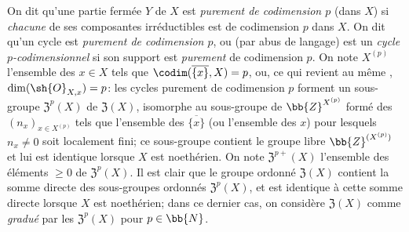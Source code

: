 \begin{env}[21.6.2]
On dit qu'une partie fermée $Y$ de $X$ est \emph{purement de codimension $p$} (dans $X$) si \emph{chacune} de ses composantes irréductibles est de codimension $p$ dans $X$.
On dit qu'un cycle est \emph{purement de codimension $p$}, ou (par abus de langage) est un \emph{cycle $p$-codimensionnel} si son support est \emph{purement} de codimension $p$.
On note $X^{(p)}$ l'ensemble des $x\in X$ tels que $\codim(\overline{\{x\}},X)=p$, ou, ce qui revient au même , $\dim(\sh{O}_{X,x})=p$:
les cycles purement de codimension $p$ forment un sous-groupe $\mathfrak{Z}^p(X)$ de $\mathfrak{Z}(X)$, isomorphe au sous-groupe de $\bb{Z}^{X^{(p)}}$ formé des $(n_x)_{x\in X^{(p)}}$ tels que l'ensemble des $\overline{\{x\}}$ (ou l'ensemble des $x$) pour lesquels $n_x\neq0$ soit localement fini;
ce sous-groupe contient le groupe libre $\bb{Z}^{(X^{(p)})}$ et lui est identique lorsque $X$ est noethérien.
On note $\mathfrak{Z}^{p+}(X)$ l'ensemble des éléments $\geq0$ de $\mathfrak{Z}^p(X)$.
Il est clair que le groupe ordonné $\mathfrak{Z}(X)$ contient la somme directe des sous-groupes ordonnés $\mathfrak{Z}^p(X)$, et est identique à cette somme directe lorsque $X$ est noethérien;
dans ce dernier cas, on considère $\mathfrak{Z}(X)$ comme \emph{gradué} par les $\mathfrak{Z}^p(X)$ pour $p\in\bb{N}$.
\end{env}

